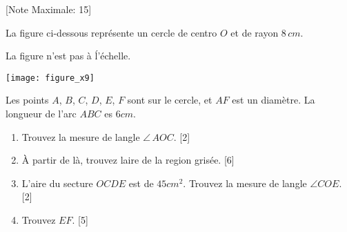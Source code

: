 \begin{question}
  \hspace*{\fill} [Note Maximale: 15]\par
  \noindent La figure ci-dessous représente un cercle de centro $O$ et de rayon $8\,cm$.\par
  \medskip
  \begin{center} %
    \noindent La figure n'est pas à ĺ'échelle.\par
    \texttt{[image: figure\_x9]}\par
  \end{center} %

  \noindent Les points $A$, $B$, $C$, $D$, $E$, $F$ sont sur le cercle, et $AF$ est un diamètre.  La longueur de l'arc $ABC$ es $6 cm$.\par
  \begin{enumerate}[label=(\alph*)]
    \item Trouvez la mesure de langle $\angle\,AOC$.\hspace*{\fill} [2]
    \item À partir de là, trouvez laire de la region grisée.\hspace*{\fill} [6]
    \item L'aire du secture $OCDE$ est de $45 cm^2$. Trouvez la mesure de langle $\angle COE$.\hspace*{\fill} [2]
    \item Trouvez $EF$.\hspace*{\fill} [5]
  \end{enumerate}
\end{question}
